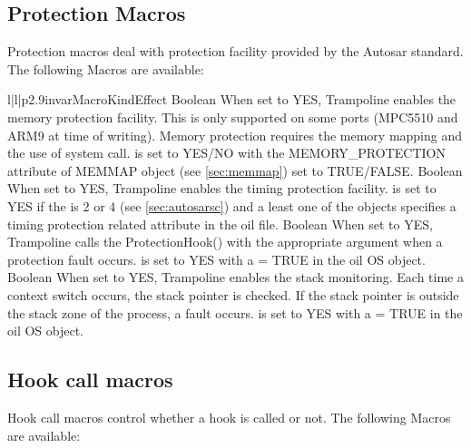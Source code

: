 \subsection{Protection Macros}

Protection macros deal with protection facility provided by the Autosar standard. The following Macros are available:

\begin{longtableiii}{l|l|p{2.9in}}{var}{Macro}{Kind}{Effect}
  {Boolean}
  {When set to YES, Trampoline enables the memory protection facility. This is only supported on some ports (MPC5510 and ARM9 at time of writing). Memory protection requires the memory mapping and the use of system call.  is set to YES/NO with the MEMORY_PROTECTION attribute of MEMMAP object (see \ref{sec:memmap}) set to TRUE/FALSE.}
  {Boolean}
  {When set to YES, Trampoline enables the timing protection facility.  is set to YES if the  is 2 or 4 (see \ref{sec:autosarsc}) and a least one of the objects specifies a timing protection related attribute in the oil file.}
  {Boolean}
  {When set to YES, Trampoline calls the ProtectionHook() with the appropriate argument when a protection fault occurs.  is set to YES with a  = TRUE in the oil OS object.}
  {Boolean}
  {When set to YES, Trampoline enables the stack monitoring. Each time a context switch occurs, the stack pointer is checked. If the stack pointer is outside the stack zone of the process, a fault occurs.  is set to YES with a  = TRUE in the oil OS object.}
\end{longtableiii}

\subsection{Hook call macros}

Hook call macros control whether a hook is called or not. The following Macros are available:

